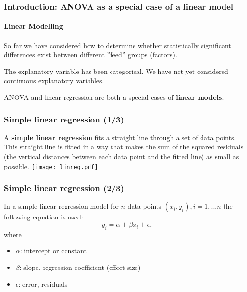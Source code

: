 \documentclass{beamer}\usepackage[]{graphicx}\usepackage[]{color}
\begin{document}
{{{%

\usebackgroundtemplate{}
\begin{frame}
\frametitle{Introduction: ANOVA as a special case of a linear model}
\framesubtitle{Linear Modelling}
So far we have considered how to determine whether statistically significant
differences exist between different ''feed'' groups (factors).

The explanatory variable has been categorical. We have not yet considered
continuous explanatory variables.

ANOVA and linear regression are both a special cases of
{\bfseries linear models}.
\end{frame}


\usebackgroundtemplate{}
\begin{frame}
\frametitle{Simple linear regression (1/3)}
A {\bfseries simple linear regression} fits a straight line through a set of
data points. This straight line is fitted in a way that makes the sum of the
squared residuals (the vertical distances between each data point and the fitted
line) as small as possible.
\texttt{[image: linreg.pdf]}
\end{frame}


\usebackgroundtemplate{}
\begin{frame}
\frametitle{Simple linear regression (2/3)}
In a simple linear regression model for $n$ data points $(x_i, y_i), i = 1, ... n$
the following equation is used:
\begin{equation}
y_i = \alpha + \beta x_i + \epsilon, \nonumber
\end{equation}
where
\begin{itemize}
\item $\alpha$: intercept or constant
\item $\beta$: slope, regression coefficient (effect size)
\item $\epsilon$: error, residuals
\end{itemize}
\end{frame}

}}}
\end{document}
